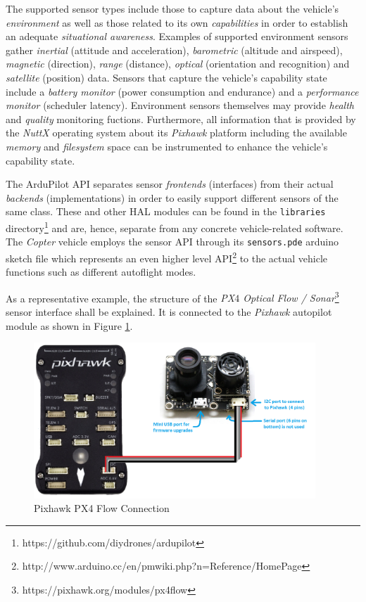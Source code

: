\documentclass[paper=letter, fontsize=11pt]{scrartcl}
\numberwithin{equation}{section}
\numberwithin{figure}{section}
\numberwithin{table}{section}
\begin{document}
\par
The supported sensor types include those to capture data about the vehicle's
{\em environment} as well as those related to its own {\em capabilities} in
order to establish an adequate {\em situational awareness}.
Examples of supported environment sensors gather {\em inertial} (attitude and
acceleration), {\em barometric} (altitude and airspeed), {\em magnetic}
(direction), {\em range} (distance), {\em optical} (orientation and recognition)
and {\em satellite} (position) data. Sensors that capture the vehicle's
capability state include a {\em battery monitor} (power consumption and
endurance) and a {\em performance monitor} (scheduler latency). Environment
sensors themselves may provide {\em health} and {\em quality} monitoring
fuctions. Furthermore, all information that is provided by the {\em NuttX}
operating system about its {\em Pixhawk} platform including the available
{\em memory} and {\em filesystem} space can be instrumented to enhance the
vehicle's capability state.

\par
The {ArduPilot} \ac{API} separates sensor {\em frontends} (interfaces) from
their actual {\em backends} (implementations) in order to easily support
different sensors of the same class. These and other \ac{HAL} modules can be
found in the \texttt{libraries}
directory\footnote{https://github.com/diydrones/ardupilot} and are, hence,
separate from any concrete vehicle-related software. The {\em Copter} vehicle
employs the sensor \ac{API} through its \texttt{sensors.pde} arduino sketch
file which represents an even higher level
\ac{API}\footnote{http://www.arduino.cc/en/pmwiki.php?n=Reference/HomePage}
to the actual vehicle functions such as different autoflight modes.

\par
As a representative example, the structure of the {\em PX$4$ Optical Flow /
Sonar}\footnote{https://pixhawk.org/modules/px4flow} sensor interface shall be
explained. It is connected to the {\em Pixhawk} autopilot module as shown in
Figure \ref{fig:pixhawk_px4_flow_connection}.

\begin{figure}[h]
	\centering
    \includegraphics[width=400px]{graphics/PixhawkPX4Flow.png}
	\caption{Pixhawk PX4 Flow Connection}
	\label{fig:pixhawk_px4_flow_connection}
\end{figure}
\end{document}
